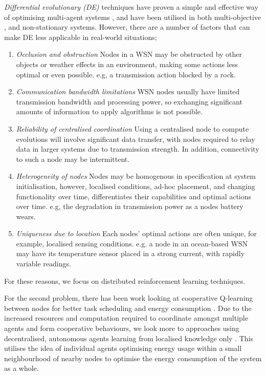 \textit{Differential evolutionary (DE)} \cite{XXX} techniques have proven a simple and effective way of optimising multi-agent systems \cite{XXX}, and have been utilised in both multi-objective \cite{XXX}, and non-stationary \cite{XXX} systems. However, there are a number of factors that can make DE less applicable in real-world situations;
\begin{enumerate}
	\item \textit{Occlusion and obstruction} Nodes in a WSN may be obstructed by other objects or weather effects in an environment, making some actions less optimal or even possible. e.g, a transmission action blocked by a rock.

	\item \textit{Communication bandwidth limitations} WSN nodes usually have limited transmission bandwidth and processing power, so exchanging significant amounts of information to apply algorithms is not possible. 
	
	\item \textit{Reliability of centralised coordination} Using a centralised node to compute evolutions will involve significant data transfer, with nodes required to relay data in larger systems due to transmission strength. In addition, connectivity to such a node may be intermittent. 
	
	\item \textit{Heterogeneity of nodes} Nodes may be homogenous in specification at system initialisation, however, localised conditions, ad-hoc placement, and changing functionality over time, differentiates their capabilities and optimal actions over time. e.g, the degradation in transmission power as a nodes battery wears.
	
	\item \textit{Uniqueness due to location} Each nodes' optimal actions are often unique, for example, localised sensing conditions. e.g. a node in an ocean-based WSN may have its temperature sensor placed in a strong current, with rapidly variable readings.  
\end{enumerate}
For these reasons, we focus on distributed reinforcement learning techniques.

For the second problem, there has been work looking at cooperative Q-learning between nodes for better task scheduling and energy consumption \citep{doi:10.1155/2014/765182}. Due to the increased resources and computation required to coordinate amongst multiple agents and form cooperative behaviours, we look more to approaches using decentralised, autonomous agents learning from localised knowledge only \citep{10.1007/978-3-642-11814-2_4}.  This utilises the idea of individual agents optimising energy usage within a small neighbourhood of nearby nodes to optimise the energy consumption of the system as a whole. 

